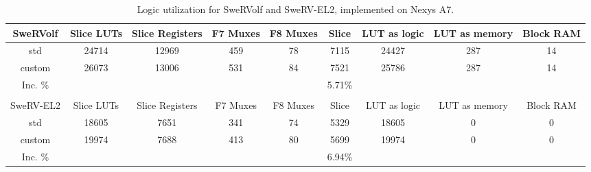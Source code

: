 \begin{table}[tp]
    \begin{tabular}{ccccccccc}
    \rowcolor[HTML]{C0C0C0} 
    SweRVolf                        & Slice LUTs           & Slice Registers      & F7 Muxes             & F8 Muxes             & Slice                          & LUT as logic         & LUT as memory        & Block RAM            \\ \hline
    \cellcolor[HTML]{EFEFEF}std     & 24714                & 12969                & 459                  & 78                   & \cellcolor[HTML]{FFCE93}7115   & 24427                & 287                  & 14                   \\
    \cellcolor[HTML]{EFEFEF}custom  & 26073                & 13006                & 531                  & 84                   & \cellcolor[HTML]{FFCE93}7521   & 25786                & 287                  & 14                   \\ \hline
    \cellcolor[HTML]{EFEFEF}Inc. \% &                      &                      &                      &                      & \cellcolor[HTML]{FFCE93}5.71\% &                      &                      &                      \\
    \multicolumn{1}{l}{}            & \multicolumn{1}{l}{} & \multicolumn{1}{l}{} & \multicolumn{1}{l}{} & \multicolumn{1}{l}{} & \multicolumn{1}{l}{}           & \multicolumn{1}{l}{} & \multicolumn{1}{l}{} & \multicolumn{1}{l}{} \\
    \rowcolor[HTML]{C0C0C0} 
    SweRV-EL2                       & Slice LUTs           & Slice Registers      & F7 Muxes             & F8 Muxes             & Slice                          & LUT as logic         & LUT as memory        & Block RAM            \\ \hline
    \cellcolor[HTML]{EFEFEF}std     & 18605                & 7651                 & 341                  & 74                   & \cellcolor[HTML]{FFCE93}5329   & 18605                & 0                    & 0                    \\
    \cellcolor[HTML]{EFEFEF}custom  & 19974                & 7688                 & 413                  & 80                   & \cellcolor[HTML]{FFCE93}5699   & 19974                & 0                    & 0                    \\ \hline
    \cellcolor[HTML]{EFEFEF}Inc. \% &                      &                      &                      &                      & \cellcolor[HTML]{FFCE93}6.94\% &                      &                      &                     
    \end{tabular}
    \caption{Logic utilization for SweRVolf and SweRV-EL2, implemented on Nexys A7.}
    \label{tab:area}
\end{table}

